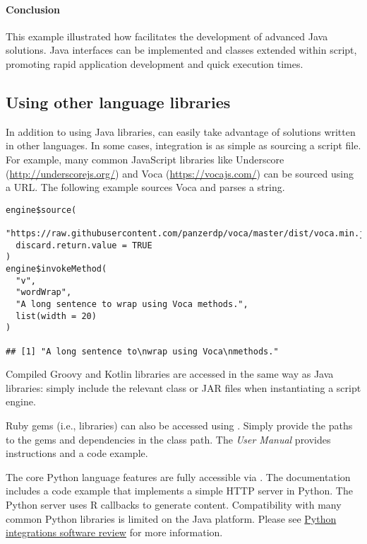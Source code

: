 \paragraph{Conclusion} This example illustrated how  facilitates the development of advanced Java solutions. Java interfaces can be implemented and classes extended within script, promoting rapid application development and quick execution times.

\subsection{Using other language libraries} %

In addition to using Java libraries,  can easily take advantage of solutions written in other languages. In some cases, integration is as simple as sourcing a script file. For example, many common JavaScript libraries like Underscore (\url{http://underscorejs.org/}) and Voca (\url{https://vocajs.com/}) can be sourced using a URL. The following example sources Voca and parses a string.

\begin{verbatim}
engine$source(
  "https://raw.githubusercontent.com/panzerdp/voca/master/dist/voca.min.js",
  discard.return.value = TRUE
)
engine$invokeMethod(
  "v",
  "wordWrap",
  "A long sentence to wrap using Voca methods.",
  list(width = 20)
)

## [1] "A long sentence to\nwrap using Voca\nmethods."
\end{verbatim}

Compiled Groovy and Kotlin libraries are accessed in the same way as Java libraries: simply include the relevant class or JAR files when instantiating a script engine.

Ruby gems (i.e., libraries) can also be accessed using . Simply provide the paths to the gems and dependencies in the class path. The \textit{ User Manual} provides instructions and a code example.

The core Python language features are fully accessible via . The  documentation includes a code example that implements a simple HTTP server in Python. The Python server uses R callbacks to generate content. Compatibility with many common Python libraries is limited on the Java platform. Please see \hyperlink{python-integrations}{Python integrations software review} for more information.

